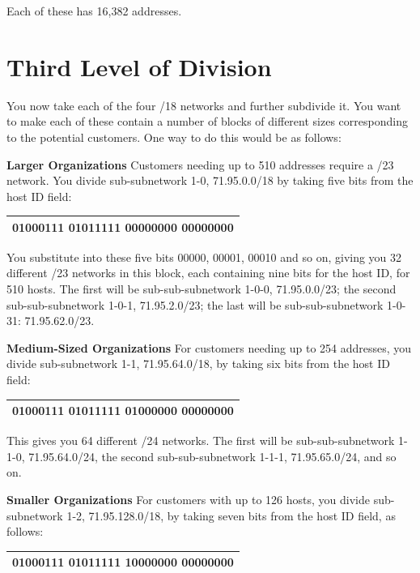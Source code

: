 Each of these has 16,382 addresses.




\section{Third Level of Division}

You now take each of the four /18 networks and further subdivide it. You
want to make each of these contain a number of blocks of different sizes
corresponding to the potential customers. One way to do this would be as
follows:

{\textbf{Larger Organizations}} Customers needing up to 510 addresses
require a /23 network. You divide sub-subnetwork 1-0, 71.95.0.0/18 by
taking five bits from the host ID field:

\begin{longtable}[]{@{}l@{}}
\toprule
\endhead
01000111 0101111{\textbf{1 {00}}}{{00000}}0 00000000\tabularnewline
\bottomrule
\end{longtable}

You substitute into these five bits 00000, 00001, 00010 and so on,
giving you 32 different /23 networks in this block, each containing nine
bits for the host ID, for 510 hosts. The first will be
sub-sub-subnetwork 1-0-0, 71.95.0.0/23; the second sub-sub-subnetwork
1-0-1, 71.95.2.0/23; the last will be sub-sub-subnetwork 1-0-31:
71.95.62.0/23.

{\textbf{Medium-Sized Organizations}} For customers needing up to 254
addresses, you divide sub-subnetwork 1-1, 71.95.64.0/18, by taking six
bits from the host ID field:

\begin{longtable}[]{@{}l@{}}
\toprule
\endhead
01000111 0101111{\textbf{1 {01}}}{{000000}} 00000000\tabularnewline
\bottomrule
\end{longtable}

This gives you 64 different /24 networks. The first will be
sub-sub-subnetwork 1-1-0, 71.95.64.0/24, the second sub-sub-subnetwork
1-1-1, 71.95.65.0/24, and so on.

{\textbf{Smaller Organizations}} For customers with up to 126 hosts, you
divide sub-subnetwork 1-2, 71.95.128.0/18, by taking seven bits from the
host ID field, as follows:

\begin{longtable}[]{@{}l@{}}
\toprule
\endhead
01000111 0101111{\textbf{1}} {\textbf{{10}}}{{000000
0}}0000000\tabularnewline
\bottomrule
\end{longtable}

